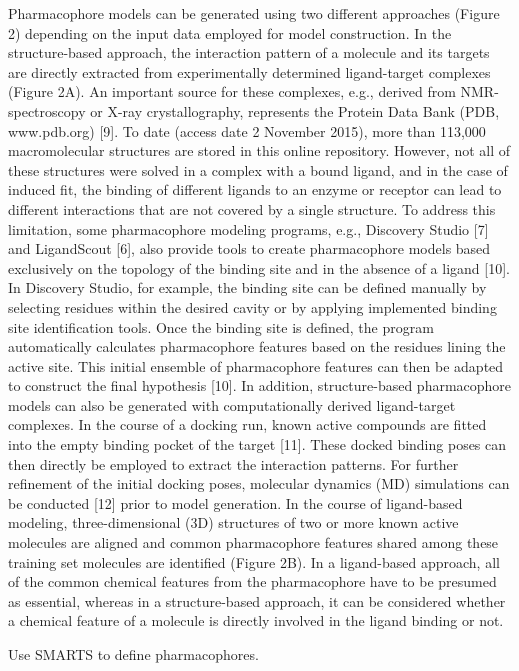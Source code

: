Pharmacophore models can be generated using two different approaches (Figure 2) depending on the input data employed for model construction. In the structure-based approach, the interaction pattern of a molecule and its targets are directly extracted from experimentally determined ligand-target complexes (Figure 2A). An important source for these complexes, e.g., derived from NMR-spectroscopy or X-ray crystallography, represents the Protein Data Bank (PDB, www.pdb.org) [9]. To date (access date 2 November 2015), more than 113,000 macromolecular structures are stored in this online repository. However, not all of these structures were solved in a complex with a bound ligand, and in the case of induced fit, the binding of different ligands to an enzyme or receptor can lead to different interactions that are not covered by a single structure. To address this limitation, some pharmacophore modeling programs, e.g., Discovery Studio [7] and LigandScout [6], also provide tools to create pharmacophore models based exclusively on the topology of the binding site and in the absence of a ligand [10]. In Discovery Studio, for example, the binding site can be defined manually by selecting residues within the desired cavity or by applying implemented binding site identification tools. Once the binding site is defined, the program automatically calculates pharmacophore features based on the residues lining the active site. This initial ensemble of pharmacophore features can then be adapted to construct the final hypothesis [10]. In addition, structure-based pharmacophore models can also be generated with computationally derived ligand-target complexes. In the course of a docking run, known active compounds are fitted into the empty binding pocket of the target [11]. These docked binding poses can then directly be employed to extract the interaction patterns. For further refinement of the initial docking poses, molecular dynamics (MD) simulations can be conducted [12] prior to model generation.
In the course of ligand-based modeling, three-dimensional (3D) structures of two or more known active molecules are aligned and common pharmacophore features shared among these training set molecules are identified (Figure 2B). In a ligand-based approach, all of the common chemical features from the pharmacophore have to be presumed as essential, whereas in a structure-based approach, it can be considered whether a chemical feature of a molecule is directly involved in the ligand binding or not.

Use SMARTS to define pharmacophores.

